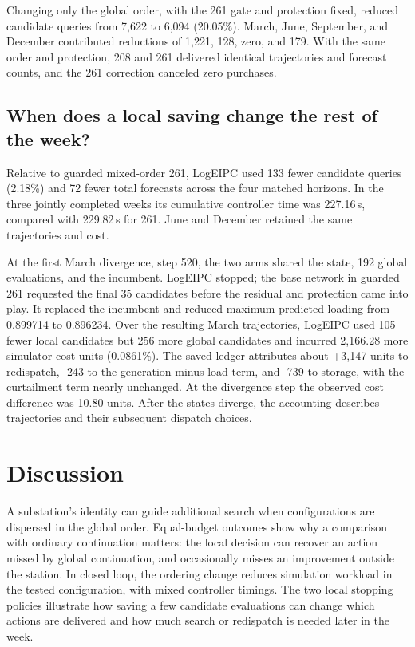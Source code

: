 \documentclass[sigconf,review,anonymous]{acmart}
\begin{document}
Changing only the global order, with the 261 gate and protection fixed, reduced candidate queries from 7,622 to 6,094 (20.05\%). March, June, September, and December contributed reductions of 1,221, 128, zero, and 179. With the same order and protection, 208 and 261 delivered identical trajectories and forecast counts, and the 261 correction canceled zero purchases.

\subsection{When does a local saving change the rest of the week?}
Relative to guarded mixed-order 261, LogEIPC used 133 fewer candidate queries (2.18\%) and 72 fewer total forecasts across the four matched horizons. In the three jointly completed weeks its cumulative controller time was 227.16\,s, compared with 229.82\,s for 261. June and December retained the same trajectories and cost.

At the first March divergence, step 520, the two arms shared the state, 192 global evaluations, and the incumbent. LogEIPC stopped; the base network in guarded 261 requested the final 35 candidates before the residual and protection came into play. It replaced the incumbent and reduced maximum predicted loading from 0.899714 to 0.896234. Over the resulting March trajectories, LogEIPC used 105 fewer local candidates but 256 more global candidates and incurred 2,166.28 more simulator cost units (0.0861\%). The saved ledger attributes about +3,147 units to redispatch, -243 to the generation-minus-load term, and -739 to storage, with the curtailment term nearly unchanged. At the divergence step the observed cost difference was 10.80 units. After the states diverge, the accounting describes trajectories and their subsequent dispatch choices.

\section{Discussion}
A substation's identity can guide additional search when configurations are dispersed in the global order. Equal-budget outcomes show why a comparison with ordinary continuation matters: the local decision can recover an action missed by global continuation, and occasionally misses an improvement outside the station. In closed loop, the ordering change reduces simulation workload in the tested configuration, with mixed controller timings. The two local stopping policies illustrate how saving a few candidate evaluations can change which actions are delivered and how much search or redispatch is needed later in the week.
\end{document}

